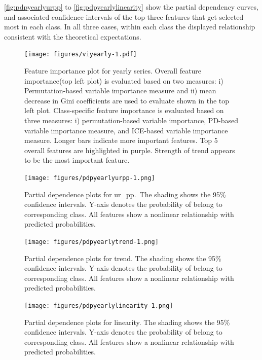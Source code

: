 \documentclass[11pt,a4paper,]{article}
\begin{document}
\autoref{fig:pdpyearlyurpp} to \autoref{fig:pdpyearlylinearity} show the
partial dependency curves, and associated confidence intervals of the
top-three features that get selected most in each class. In all three
cases, within each class the displayed relationship consistent with the
theoretical expectations.

\begin{figure}
\centering
\texttt{[image: figures/viyearly-1.pdf]}
\caption{\label{fig:viyearly}Feature importance plot for yearly series.
Overall feature importance(top left plot) is evaluated based on two
measures: i) Permutation-based variable importance measure and ii) mean
decrease in Gini coefficients are used to evaluate shown in the top left
plot. Class-specific feature importance is evaluated based on three
measures: i) permutation-based variable importance, PD-based variable
importance measure, and ICE-based variable importance measure. Longer
bars indicate more important features. Top 5 overall features are
highlighted in purple. Strength of trend appears to be the most
important feature.}
\end{figure}

\newpage

\begin{figure}
\centering
\texttt{[image: figures/pdpyearlyurpp-1.png]}
\caption{\label{fig:pdpyearlyurpp}Partial dependence plots for ur\_pp.~The
shading shows the 95\% confidence intervals. Y-axis denotes the
probability of belong to corresponding class. All features show a
nonlinear relationship with predicted probabilities.}
\end{figure}

\begin{figure}
\centering
\texttt{[image: figures/pdpyearlytrend-1.png]}
\caption{\label{fig:pdpyearlytrend}Partial dependence plots for trend. The
shading shows the 95\% confidence intervals. Y-axis denotes the
probability of belong to corresponding class. All features show a
nonlinear relationship with predicted probabilities.}
\end{figure}

\begin{figure}
\centering
\texttt{[image: figures/pdpyearlylinearity-1.png]}
\caption{\label{fig:pdpyearlylinearity}Partial dependence plots for
linearity. The shading shows the 95\% confidence intervals. Y-axis
denotes the probability of belong to corresponding class. All features
show a nonlinear relationship with predicted probabilities.}
\end{figure}
\end{document}
